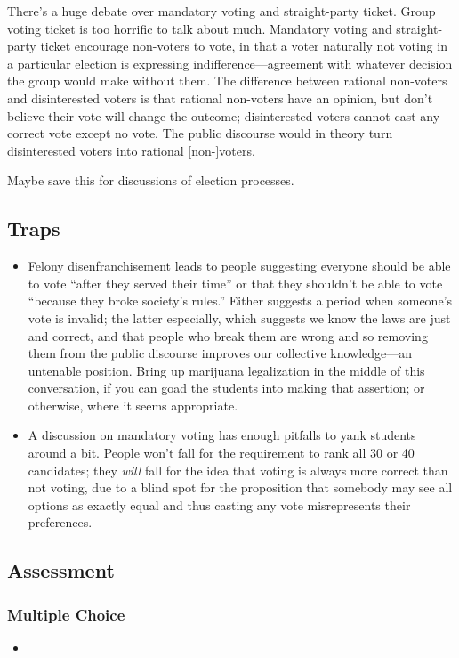 \begin{todo}
    There's a huge debate over mandatory voting and straight-party ticket.  Group voting ticket is too horrific to talk about much.  Mandatory voting and straight-party ticket encourage non-voters to vote, in that a voter naturally not voting in a particular election is expressing indifference—agreement with whatever decision the group would make without them.  The difference between rational non-voters and disinterested voters is that rational non-voters have an opinion, but don't believe their vote will change the outcome; disinterested voters cannot cast any correct vote except no vote.  The public discourse would in theory turn disinterested voters into rational [non-]voters.

    Maybe save this for discussions of election processes.
\end{todo}

\subsection{Traps}

\begin{itemize}
    \item Felony disenfranchisement leads to people suggesting everyone should be able to vote ``after they served their time'' or that they shouldn't be able to vote ``because they broke society's rules.''  Either suggests a period when someone's vote is invalid; the latter especially, which suggests we know the laws are just and correct, and that people who break them are wrong and so removing them from the public discourse improves our collective knowledge—an untenable position.  Bring up marijuana legalization in the middle of this conversation, if you can goad the students into making that assertion; or otherwise, where it seems appropriate.

    \item A discussion on mandatory voting has enough pitfalls to yank students around a bit.  People won't fall for the requirement to rank all 30 or 40 candidates; they \textit{will} fall for the idea that voting is always more correct than not voting, due to a blind spot for the proposition that somebody may see all options as exactly equal and thus casting any vote misrepresents their preferences.
\end{itemize}

\subsection{Assessment}

\subsubsection{Multiple Choice}

\begin{itemize}
    \item {}
\end{itemize}
